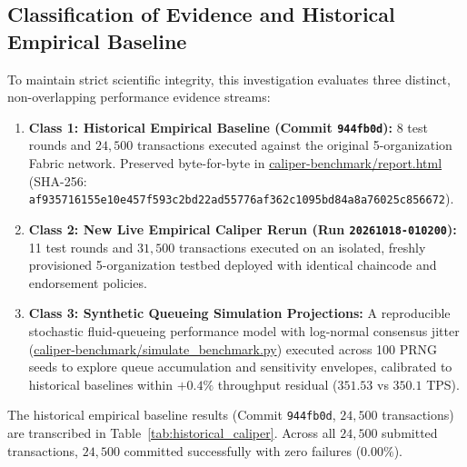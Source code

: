 \documentclass[runningheads]{llncs}
\begin{document}
\subsection{Classification of Evidence and Historical Empirical Baseline}
To maintain strict scientific integrity, this investigation evaluates three distinct, non-overlapping performance evidence streams:
\begin{enumerate}
    \item \textbf{Class 1: Historical Empirical Baseline (Commit \texttt{944fb0d}):} 8 test rounds and $24,500$ transactions executed against the original 5-organization Fabric network. Preserved byte-for-byte in \url{caliper-benchmark/report.html} (SHA-256: \texttt{af935716155e10e457f593c2bd22ad55776af362c1095bd84a8a76025c856672}).
    \item \textbf{Class 2: New Live Empirical Caliper Rerun (Run \texttt{20261018-010200}):} 11 test rounds and $31,500$ transactions executed on an isolated, freshly provisioned 5-organization testbed deployed with identical chaincode and endorsement policies.
    \item \textbf{Class 3: Synthetic Queueing Simulation Projections:} A reproducible stochastic fluid-queueing performance model with log-normal consensus jitter (\url{caliper-benchmark/simulate_benchmark.py}) executed across 100 PRNG seeds to explore queue accumulation and sensitivity envelopes, calibrated to historical baselines within $+0.4\%$ throughput residual ($351.53$ vs $350.1$ TPS).
\end{enumerate}

The historical empirical baseline results (Commit \texttt{944fb0d}, $24,500$ transactions) are transcribed in Table~\ref{tab:historical_caliper}. Across all $24,500$ submitted transactions, $24,500$ committed successfully with zero failures ($0.00\%$).
\end{document}
